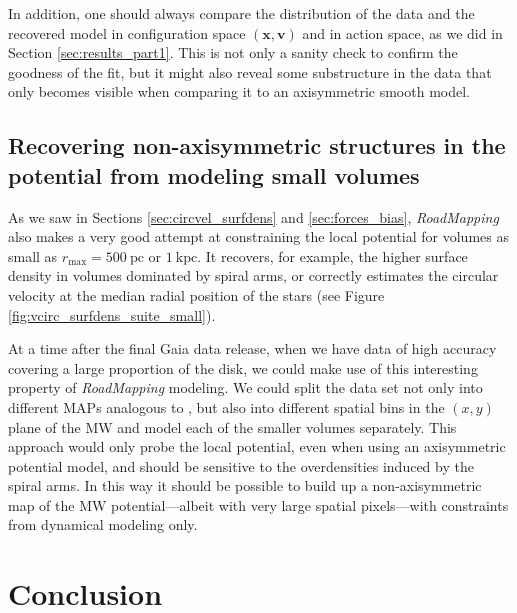 \documentclass[iop,revtex4,numberedappendix,appendixfloats]{emulateapj}
\newcommand{\vect}[1]{\boldsymbol{#1}}
\newcommand{\RM}{{\sl RoadMapping}}
\begin{document}
In addition, one should always compare the distribution of the data and the recovered model in configuration space $(\vect{x},\vect{v})$ and in action space, as we did in Section \ref{sec:results_part1}. This is not only a sanity check to confirm the goodness of the fit, but it might also reveal some substructure in the data that only becomes visible when comparing it to an axisymmetric smooth model.

\subsection{Recovering non-axisymmetric structures in the potential from modeling small volumes}

As we saw in Sections \ref{sec:circvel_surfdens} and \ref{sec:forces_bias}, \RM{} also makes a very good attempt at constraining the local potential for volumes as small as $r_\text{max}=500~\text{pc}$ or $1~\text{kpc}$. It recovers, for example, the higher surface density in volumes dominated by spiral arms, or correctly estimates the circular velocity at the median radial position of the stars (see Figure \ref{fig:vcirc_surfdens_suite_small}). 

At a time after the final Gaia data release, when we have data of high accuracy covering a large proportion of the disk, we could make use of this interesting property of \RM{} modeling. We could split the data set not only into different MAPs analogous to \citet{2013ApJ...779..115B}, but also into different spatial bins in the $(x,y)$ plane of the MW and model each of the smaller volumes separately. This approach would only probe the local potential, even when using an axisymmetric potential model, and should be sensitive to the overdensities induced by the spiral arms. In this way it should be possible to build up a non-axisymmetric map of the MW potential---albeit with very large spatial pixels---with constraints from dynamical modeling only.

\section{Conclusion} \label{sec:conclusion}
\end{document}

